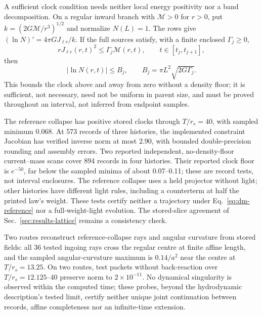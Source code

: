 A sufficient clock condition needs neither local energy positivity
nor a band decomposition. On a regular inward branch with
\(\mathcal M>0\) for \(r>0\), put
\(k=(2G\mathcal M/r^3)^{1/2}\) and normalize \(N(L)=1\).
The rows give \((\ln N)'=4\pi GJ_{\ell r}/k\). If the full sources
satisfy, with a finite enclosed \(\Gamma_j\ge0\),
\begin{equation}
 rJ_{\ell r}(r,t)^2\le\Gamma_j\mathcal M(r,t),
 \qquad t\in[t_j,t_{j+1}],
 \label{eq:sg-current-mass}
\end{equation}
then
\begin{equation}
 |\ln N(r,t)|\le B_j,\qquad
 B_j=\pi L^2\sqrt{2G\Gamma_j}.
 \label{eq:sg-clock-bound}
\end{equation}
This bounds the clock above and away from zero without a density
floor; it is sufficient, not necessary, need not be uniform in
parent size, and must be proved throughout an interval, not
inferred from endpoint samples.

The reference collapse has positive stored clocks through
\(T/r_s=40\), with sampled minimum \(0.068\).
At 573 records of three histories, the implemented constraint
Jacobian has verified inverse norm at most \(2.90\), with bounded
double-precision rounding and assembly errors.
Two reported independent, no-density-floor current--mass scans
cover 894 records in four histories. Their reported clock floor
is \(e^{-50}\), far below the sampled minima of about
0.07--0.11; these are record tests, not interval enclosures.
The reference collapse uses a held projector without light;
other histories have different light rules, including a
counterterm at half the printed law's weight. These tests certify
neither a trajectory under Eq.~\eqref{eq:dm-reference} nor a
full-weight-light evolution. The stored-slice agreement of
Sec.~\ref{sec:results-lattice} remains a consistency check.

Two routes reconstruct reference-collapse rays and angular
curvature from stored fields: all 36 tested ingoing rays cross
the regular centre at finite affine length, and the sampled
angular-curvature maximum is \(0.14/a^2\) near the centre at
\(T/r_s=13.25\). On two routes, test packets without back-reaction
over \(T/r_s=12.125\)--40 preserve norm to \(2\times10^{-11}\).
No dynamical singularity is observed within the computed time;
these probes, beyond the hydrodynamic description's tested limit,
certify neither unique joint continuation between records,
affine completeness nor an infinite-time extension.


